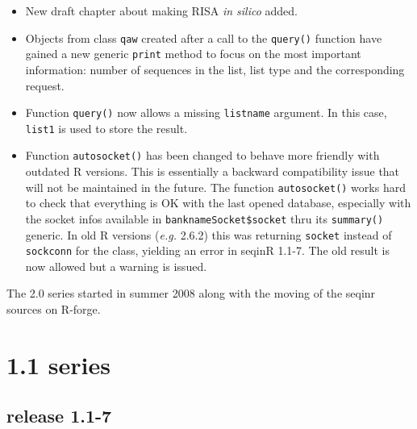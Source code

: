 \documentclass{article}
\begin{document}
\begin{itemize}

\item New draft chapter about making RISA \textit{in silico} added.

\item Objects from class \texttt{qaw} created after a call to the
  \texttt{query()} function have gained a new generic \texttt{print}
  method to focus on the most important information: number
  of sequences in the list, list type and the corresponding request.

\item Function \texttt{query()} now allows a missing \texttt{listname}
  argument. In this case, \texttt{list1} is used to store the
  result.

\item Function \texttt{autosocket()} has been changed to behave more
  friendly with outdated R versions. This is essentially a backward
  compatibility issue that will not be maintained in the future.
  The function \texttt{autosocket()} works hard to check that everything
  is OK with the last opened database, especially with the socket
  infos available in \texttt{banknameSocket\$socket} thru its 
  \texttt{summary()} generic. In old R versions (\textit{e.g.} 2.6.2) this
  was returning \texttt{socket} instead of \texttt{sockconn} for the
  class, yielding an error in seqinR 1.1-7. The old result is now
  allowed but a warning is issued.

\end{itemize}

The 2.0 series started in summer 2008 along with the moving
of the seqinr sources on R-forge.

\section*{1.1 series}

\subsection*{release 1.1-7}
\end{document}

